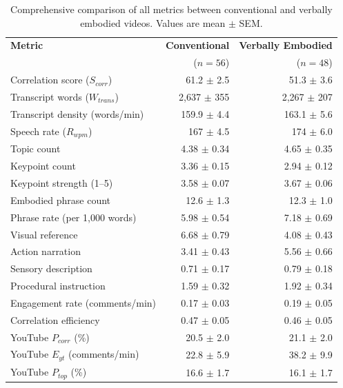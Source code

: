 \begin{table}[h!]
    \centering
    \caption{Comprehensive comparison of all metrics between conventional and verbally embodied videos. Values are mean $\pm$ SEM.}
    \begin{tabular}{l r r}
        \toprule
        \textbf{Metric} & \textbf{Conventional} & \textbf{Verbally Embodied} \\
        & ($n = 56$) & ($n = 48$) \\
        \midrule
        Correlation score ($S_{corr}$) & 61.2 $\pm$ 2.5 & 51.3 $\pm$ 3.6 \\
        Transcript words ($W_{trans}$) & 2{,}637 $\pm$ 355 & 2{,}267 $\pm$ 207 \\
        Transcript density (words/min) & 159.9 $\pm$ 4.4 & 163.1 $\pm$ 5.6 \\
        Speech rate ($R_{wpm}$) & 167 $\pm$ 4.5 & 174 $\pm$ 6.0 \\
        Topic count & 4.38 $\pm$ 0.34 & 4.65 $\pm$ 0.35 \\
        Keypoint count & 3.36 $\pm$ 0.15 & 2.94 $\pm$ 0.12 \\
        Keypoint strength (1--5) & 3.58 $\pm$ 0.07 & 3.67 $\pm$ 0.06 \\
        Embodied phrase count & 12.6 $\pm$ 1.3 & 12.3 $\pm$ 1.0 \\
        Phrase rate (per 1{,}000 words) & 5.98 $\pm$ 0.54 & 7.18 $\pm$ 0.69 \\
        Visual reference & 6.68 $\pm$ 0.79 & 4.08 $\pm$ 0.43 \\
        Action narration & 3.41 $\pm$ 0.43 & 5.56 $\pm$ 0.66 \\
        Sensory description & 0.71 $\pm$ 0.17 & 0.79 $\pm$ 0.18 \\
        Procedural instruction & 1.59 $\pm$ 0.32 & 1.92 $\pm$ 0.34 \\
        Engagement rate (comments/min) & 0.17 $\pm$ 0.03 & 0.19 $\pm$ 0.05 \\
        Correlation efficiency & 0.47 $\pm$ 0.05 & 0.46 $\pm$ 0.05 \\
        YouTube $P_{corr}$ (\%) & 20.5 $\pm$ 2.0 & 21.1 $\pm$ 2.0 \\
        YouTube $E_{yt}$ (comments/min) & 22.8 $\pm$ 5.9 & 38.2 $\pm$ 9.9 \\
        YouTube $P_{top}$ (\%) & 16.6 $\pm$ 1.7 & 16.1 $\pm$ 1.7 \\
        \bottomrule
    \end{tabular}
    \label{tab:full_comparison}
\end{table}

